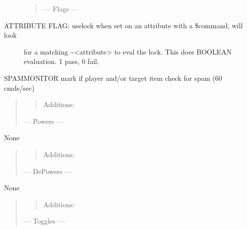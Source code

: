 \documentclass[letterpaper,10pt,english]{sphinxmanual}
\begin{document}
\begin{description}
\begin{optionlist}{3cm}
\begin{itemize}
\end{itemize}
\begin{quote}

\sphinxAtStartPar
— Flags —
\end{quote}
\end{optionlist}

\item[{ATTRIBUTE FLAG: uselock \sphinxhyphen{} when set on an attribute with a \$command, will look}] \leavevmode
\sphinxAtStartPar
for a matching \textasciitilde{}\textless{}attribute\textgreater{} to eval the lock.
This does BOOLEAN evaluation.  1 pass, 0 fail.

\end{description}

\sphinxAtStartPar
SPAMMONITOR \sphinxhyphen{} mark if player and/or target item check for spam (60 cmds/sec)
\begin{quote}
\begin{quote}

\sphinxAtStartPar
Additions:
\end{quote}

\sphinxAtStartPar
— Powers —
\end{quote}

\sphinxAtStartPar
None
\begin{quote}
\begin{quote}

\sphinxAtStartPar
Additions:
\end{quote}

\sphinxAtStartPar
— De\sphinxhyphen{}Powers —
\end{quote}

\sphinxAtStartPar
None
\begin{quote}
\begin{quote}

\sphinxAtStartPar
Additions:
\end{quote}

\sphinxAtStartPar
— Toggles —
\end{quote}
\end{document}

